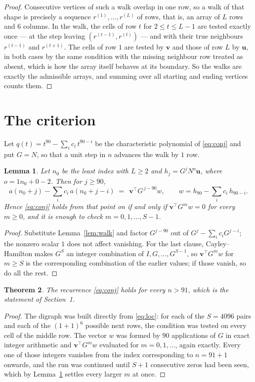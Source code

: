 \documentclass[11pt,a4paper]{article}
\theoremstyle{plain}
\newtheorem{theorem}{Theorem}
\newtheorem{lemma}[theorem]{Lemma}
\theoremstyle{definition}
\begin{document}
\begin{proof}
Consecutive vertices of such a walk overlap in one row, so a walk of that shape is
precisely a sequence $r^{(1)},\dots,r^{(L)}$ of rows, that is, an array of $L$ rows
and $6$ columns. In the walk, the cells of row $t$ for $2\le t\le L-1$ are tested
exactly once --- at the step leaving $(r^{(t-1)},r^{(t)})$ --- and with their true
neighbours $r^{(t-1)}$ and $r^{(t+1)}$. The cells of row $1$ are tested by
$\mathbf{v}$ and those of row $L$ by $\mathbf{u}$, in both cases by the same condition
with the missing neighbour row treated as absent, which is how the array itself behaves at
its boundary. So the walks are exactly the admissible arrays, and summing over all starting
and ending vertices counts them.
\end{proof}

\section{The criterion}

Let $q(t)=t^{90}-\sum_i c_i\,t^{90-i}$ be the characteristic polynomial of
\eqref{eq:conj} and put $G=N$, so that a unit step in $n$ advances the walk by
$1$ row.

\begin{lemma}\label{lem:crit}
Let $n_0$ be the least index with $L\ge2$ and $h_j=G^{j}N^{o}\mathbf{u}$, where
$o=1n_0+0-2$. Then for $j\ge90$,
\[
a(n_0+j)-\sum_i c_i\,a(n_0+j-i)\;=\;\,\mathbf{v}^{\!\top}G^{\,j-90}w,
\qquad w=h_{90}-\sum_i c_i\,h_{90-i} .
\]
Hence \eqref{eq:conj} holds from that point on if and only if
$\mathbf{v}^{\!\top}G^{m}w=0$ for every $m\ge0$, and it is enough to check
$m=0,1,\dots,S-1$.
\end{lemma}

\begin{proof}
Substitute Lemma~\ref{lem:walk} and factor $G^{j-90}$ out of
$G^{j}-\sum_ic_iG^{j-i}$; the nonzero scalar $1$ does not affect
vanishing. For the last clause, Cayley--Hamilton makes $G^{S}$ an integer combination of
$I,G,\dots,G^{S-1}$, so $\mathbf{v}^{\!\top}G^{m}w$ for $m\ge S$ is the corresponding
combination of the earlier values; if those vanish, so do all the rest.
\end{proof}

\begin{theorem}
The recurrence \eqref{eq:conj} holds for every $n>91$, which is the statement of
Section~1.
\end{theorem}

\begin{proof}
The digraph was built directly from \eqref{eq:loc}: for each of the $S=4096$ pairs and each
of the $(1+1)^{6}$ possible next rows, the condition was tested on every cell of
the middle row. The vector $w$ was formed by $90$ applications of $G$ in exact integer
arithmetic and $\mathbf{v}^{\!\top}G^{m}w$ evaluated for $m=0,1,\dots$, again exactly.
Every one of those integers vanishes from the index corresponding to $n=91+1$ onwards,
and the run was continued until $S+1$ consecutive zeros had been seen, which by
Lemma~\ref{lem:crit} settles every larger $m$ at once.
\end{proof}
\end{document}
